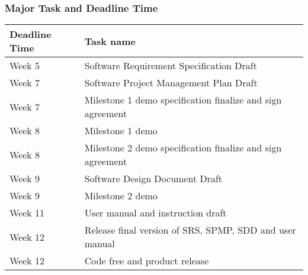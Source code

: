 \subsubsection{Major Task and Deadline Time}
	\begin{tabular}{|p{3cm}|p{8cm}|}
		\hline 
		\textbf{Deadline Time} &\textbf{Task name} \\ 
		\hline 
			Week 5 & Software Requirement Specification Draft\\ 
		\hline 
			Week 7 & Software Project Management Plan Draft\\ 
		\hline 		
			Week 7 & Milestone 1 demo specification finalize and sign agreement\\ 
		\hline 
			Week 8 & Milestone 1 demo\\ 
		\hline 
			Week 8 & Milestone 2 demo specification finalize and sign agreement\\ 
		\hline 
			Week 9 & Software Design Document Draft\\ 
		\hline 
			Week 9 & Milestone 2 demo\\ 
		\hline 		
			Week 11 & User manual and instruction draft\\ 
		\hline 
			Week 12 & Release final version of SRS, SPMP, SDD and user manual\\ 
		\hline 
			Week 12 & Code free and product release\\ 
		\hline 
	\end{tabular} 

